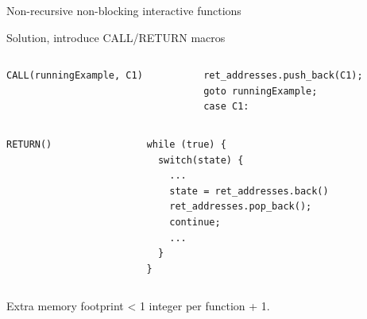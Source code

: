 \documentclass[aspectratio=169,11pt]{beamer}
\begin{document}
\begin{frame}{Non-recursive non-blocking interactive functions}
{
}
\end{frame}

\begin{frame}{Solution, introduce CALL/RETURN macros}
\begin{columns}[T,onlytextwidth]
\begin{column}{0.50\textwidth}
\begin{lstlisting}[style=cppstyle, numbers=none]
CALL(runningExample, C1)
\end{lstlisting}
\end{column}
\begin{column}{0.48\textwidth}
\begin{lstlisting}[style=cppstyle, numbers=none]
ret_addresses.push_back(C1);
goto runningExample;
case C1:
\end{lstlisting}
\end{column}
\end{columns}

\begin{columns}[T,onlytextwidth]
\begin{column}{0.50\textwidth}
\begin{lstlisting}[style=cppstyle, numbers=none]
RETURN()
\end{lstlisting}
\end{column}
\begin{column}{0.48\textwidth}
\begin{lstlisting}[style=cppstyle, numbers=none]
while (true) {
  switch(state) {
    ...
    state = ret_addresses.back()
    ret_addresses.pop_back();
    continue;
    ...
  }
}
\end{lstlisting}
\end{column}
\end{columns}
Extra memory footprint < 1 integer per function + 1.
\end{frame}
\end{document}
